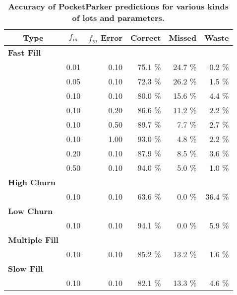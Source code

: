 \begin{table}[t]
\begin{threeparttable}
{\small
\begin{tabularx}{\columnwidth}{Xrrrrr}
\multicolumn{1}{c}{\textbf{Type}} & 
\multicolumn{1}{c}{\textbf{$f_m$}} & 
\multicolumn{1}{c}{\textbf{$f_m$ Error}} & 
\multicolumn{1}{c}{\textbf{Correct}} & 
\multicolumn{1}{c}{\textbf{Missed}} & 
\multicolumn{1}{c}{\textbf{Waste}}\\ \toprule

\textbf{Fast Fill} & & & & & \\
\midrule
& 0.01 & 0.10 & 75.1 \% & 24.7 \% & 0.2 \% \\
& 0.05 & 0.10 & 72.3 \% & 26.2 \% & 1.5 \% \\
& 0.10 & 0.10 & 80.0 \% & 15.6 \% & 4.4 \% \\
& 0.10 & 0.20 & 86.6 \% & 11.2 \% & 2.2 \% \\
& 0.10 & 0.50 & 89.7 \% & 7.7 \% & 2.7 \% \\
& 0.10 & 1.00 & 93.0 \% & 4.8 \% & 2.2 \% \\
& 0.20 & 0.10 & 87.9 \% & 8.5 \% & 3.6 \% \\
& 0.50 & 0.10 & 94.0 \% & 5.0 \% & 1.0 \% \\
\textbf{High Churn} & & & & & \\
\midrule
& 0.10 & 0.10 & 63.6 \% & 0.0 \% & 36.4 \% \\
\textbf{Low Churn} & & & & & \\
\midrule
& 0.10 & 0.10 & 94.1 \% & 0.0 \% & 5.9 \% \\
\textbf{Multiple Fill} & & & & & \\
\midrule
& 0.10 & 0.10 & 85.2 \% & 13.2 \% & 1.6 \% \\
\textbf{Slow Fill} & & & & & \\
\midrule
& 0.10 & 0.10 & 82.1 \% & 13.3 \% & 4.6 \% \\
\end{tabularx}
}
\caption{\textbf{Accuracy of PocketParker predictions for various kinds of lots and parameters.}}
\label{table-accuracy}
\end{threeparttable}
\end{table}
